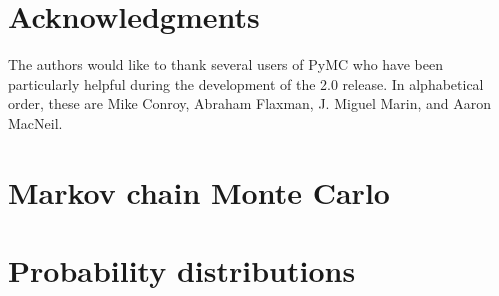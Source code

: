 \documentclass[]{jss_mod}
\begin{document}
\section[Acknowledgments]{Acknowledgments}
\label{sec:acknowledge}
The authors would like to thank several users of PyMC who have been particularly helpful during the development of the 2.0 release. In alphabetical order, these are Mike Conroy, Abraham Flaxman, J. Miguel Marin, and Aaron MacNeil.

\appendix
\section[MCMC]{Markov chain Monte Carlo} 
\label{sec:MCMC} 


\section[Distributions]{Probability distributions} 
\label{sec:distributions}


\nocite{Bernardo:1992fk}

\end{document}
